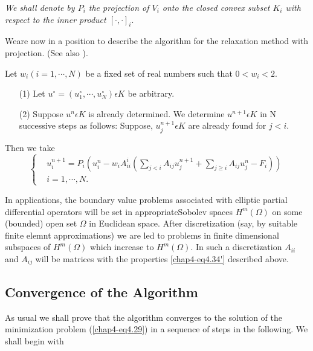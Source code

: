 {\em We shall denote by $P_{i}$ the projection of $V_{i}$ onto the closed convex subset $K_{i}$ with respect to the inner product $[\cdot , \cdot]_{i}$}.

We\pageoriginale are now in a position to describe the algorithm for the relaxation method with projection. (See also \cite{key19}).

\medskip
{}

Let $w_{i} (i = 1, \cdots, N)$ be a fixed set of real numbers such that $0 < w_{i} < 2$.
\begin{enumerate}
\item[(1)] Let $u^{\circ} = (u_{1}^{\circ}, \cdots , u_{N}^{\circ}) \epsilon K$ be arbitrary.
\item[(2)] Suppose $u^{n} \epsilon K$ is already determined. We determine $u^{n+1} \epsilon K$ in N successive steps as follows: Suppose, $u_{j}^{n+1} \epsilon K$ are already found for $j < i$.
\end{enumerate}

Then we take
\begin{equation*}
\begin{cases}
& u_{i}^{n+1} = P_{i} (u_{i}^{n} - w_{i} A_{ii}^{i} (\sum\limits_{j < i} A_{ij} u_{j}^{n+1} + \sum\limits_{j \geq i} A_{ij} u_{j}^{n} - F_{i}))\\
& i = 1, \cdots, N.
\end{cases}\tag{4.38}\label{chap4-eq4.38}
\end{equation*}


\begin{remark}\label{chap4-rem4.5}
In applications, the boundary value problems associated with elliptic partial differential operators will be set in appropriate\break Sobolev spaces $H^{m}(\Omega)$ on some (bounded) open set $\Omega$ in Euclidean space. After discretization (say, by suitable finite elemnt approximations) we are led to problems in finite dimensional subspaces of $H^{m} (\Omega)$ which increase to $H^{m} (\Omega)$. In such a discretization $A_{ii}$ and $A_{ij}$ will be matrices with the properties \ref{chap4-eq4.34'} described above.
\end{remark}

\subsection{Convergence of the Algorithm}\label{chap4-subsec4.7}
As usual we shall prove that the algorithm converges to the solution of the minimization problem (\ref{chap4-eq4.29}) in a sequence of steps in the following. We shall begin with

